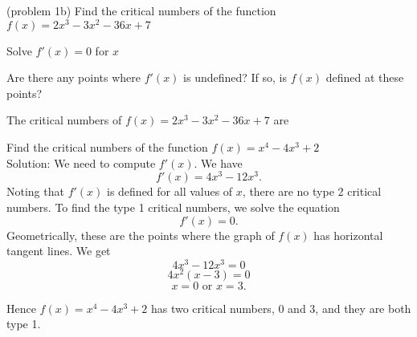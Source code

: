 \documentclass{ximera}
\begin{document}
\begin{problem}(problem 1b)
  Find the critical numbers of the function $f(x) = 2x^3 - 3x^2 -36x + 7$
    
		\begin{hint}
      Solve $f'(x) = 0$ for $x$
    \end{hint}
    \begin{hint}
      Are there any points where $f'(x)$ is undefined?
      If so, is $f(x)$ defined at these points?  
		\end{hint}
    
    
		The critical numbers of $f(x) = 2x^3 - 3x^2 -36x + 7$ are
		\begin{multipleChoice}
		\end{multipleChoice}
		\end{problem}

\begin{example}[example 2]
Find the critical numbers of the function $f(x) = x^4 - 4x^3 + 2$\\
Solution: We need to compute $f'(x)$.  We have
\[f'(x) = 4x^3 - 12x^3.\]
Noting that $f'(x)$ is defined for all values of $x$, there are no type 2 critical numbers.
To find the type 1 critical numbers, we solve the equation
\[f'(x) = 0.\]
Geometrically, these are the points where the graph of $f(x)$ has horizontal tangent lines.
We get
\[ 4x^3 - 12x^3 =0\]
\[ 4x^2(x-3) =0\]
\[x = 0 \mbox{  or  } x = 3.\]

Hence $f(x) = x^4 - 4x^3 + 2$ has two critical numbers, $0$ and $3$, and they are both type 1.
\begin{image}
\end{image}

\end{example}
\end{document}
